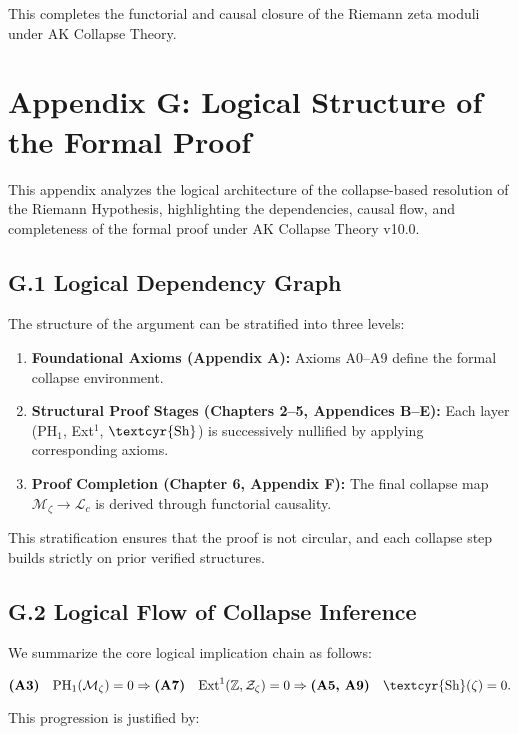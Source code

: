 \documentclass[11pt]{article}
\newcommand{\Sha}{\text{\textcyr{Sh}}}
\begin{document}
This completes the functorial and causal closure of the Riemann zeta moduli under AK Collapse Theory.



\section*{Appendix G: Logical Structure of the Formal Proof}

This appendix analyzes the logical architecture of the collapse-based resolution of the Riemann Hypothesis,  
highlighting the dependencies, causal flow, and completeness of the formal proof under AK Collapse Theory v10.0.

\subsection*{G.1 Logical Dependency Graph}

The structure of the argument can be stratified into three levels:

\begin{enumerate}
    \item \textbf{Foundational Axioms (Appendix A):} Axioms A0–A9 define the formal collapse environment.
    \item \textbf{Structural Proof Stages (Chapters 2–5, Appendices B–E):}  
    Each layer (PH$_1$, Ext$^1$, $\Sha$) is successively nullified by applying corresponding axioms.
    \item \textbf{Proof Completion (Chapter 6, Appendix F):}  
    The final collapse map $\mathcal{M}_\zeta \to \mathcal{L}_c$ is derived through functorial causality.
\end{enumerate}

This stratification ensures that the proof is not circular, and each collapse step builds strictly on prior verified structures.

\subsection*{G.2 Logical Flow of Collapse Inference}

We summarize the core logical implication chain as follows:

\[
\textbf{(A3)}\quad \mathrm{PH}_1(\mathcal{M}_\zeta) = 0 \Rightarrow \textbf{(A7)}\quad \mathrm{Ext}^1(\mathbb{Z}, \mathcal{Z}_\zeta) = 0 \Rightarrow \textbf{(A5, A9)}\quad \Sha(\zeta) = 0.
\]

This progression is justified by:
\end{document}
